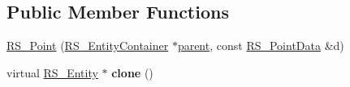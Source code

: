 \subsection*{Public Member Functions}
\begin{DoxyCompactItemize}
\item 
\hyperlink{classRS__Point_a8fcfa09ec72aecf2eb8ec07b221892fc}{R\-S\-\_\-\-Point} (\hyperlink{classRS__EntityContainer}{R\-S\-\_\-\-Entity\-Container} $\ast$\hyperlink{classRS__Entity_a80358a8d2fc6739a516a278dc500b49f}{parent}, const \hyperlink{classRS__PointData}{R\-S\-\_\-\-Point\-Data} \&d)
\item 
\hypertarget{classRS__Point_ad07659aa002d5cd6ac6f423f88620951}{virtual \hyperlink{classRS__Entity}{R\-S\-\_\-\-Entity} $\ast$ {\bfseries clone} ()}\label{classRS__Point_ad07659aa002d5cd6ac6f423f88620951}


\end{DoxyCompactItemize}
